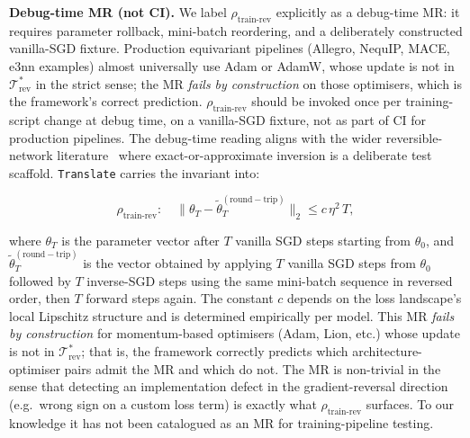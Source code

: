 \documentclass[manuscript]{acmart}
\begin{document}
\textbf{Debug-time MR (not CI).} We label $\rho_{\mathrm{train\text{-}rev}}$ explicitly as a debug-time MR: it requires parameter rollback, mini-batch reordering, and a deliberately constructed vanilla-SGD fixture. Production equivariant pipelines (Allegro, NequIP, MACE, e3nn examples) almost universally use Adam or AdamW, whose update is not in $\mathcal{T}^{*}_{\mathrm{rev}}$ in the strict sense; the MR \emph{fails by construction} on those optimisers, which is the framework's correct prediction. $\rho_{\mathrm{train\text{-}rev}}$ should be invoked once per training-script change at debug time, on a vanilla-SGD fixture, not as part of CI for production pipelines. The debug-time reading aligns with the wider reversible-network literature~\cite{Gomez2017Reversible} where exact-or-approximate inversion is a deliberate test scaffold. \texttt{Translate} carries the invariant into:

\begin{equation}
\rho_{\mathrm{train\text{-}rev}}: \quad \big\| \theta_T - \tilde\theta_T^{\mathrm{(round-trip)}} \big\|_2 \le c\,\eta^{2}\,T,
\end{equation}

\noindent where $\theta_T$ is the parameter vector after $T$ vanilla SGD steps starting from $\theta_0$, and $\tilde\theta_T^{\mathrm{(round-trip)}}$ is the vector obtained by applying $T$ vanilla SGD steps from $\theta_0$ followed by $T$ inverse-SGD steps using the same mini-batch sequence in reversed order, then $T$ forward steps again. The constant $c$ depends on the loss landscape's local Lipschitz structure and is determined empirically per model. This MR \emph{fails by construction} for momentum-based optimisers (Adam, Lion, etc.) whose update is not in $\mathcal{T}^{*}_{\mathrm{rev}}$; that is, the framework correctly predicts which architecture-optimiser pairs admit the MR and which do not. The MR is non-trivial in the sense that detecting an implementation defect in the gradient-reversal direction (e.g.\ wrong sign on a custom loss term) is exactly what $\rho_{\mathrm{train\text{-}rev}}$ surfaces. To our knowledge it has not been catalogued as an MR for training-pipeline testing.
\end{document}
